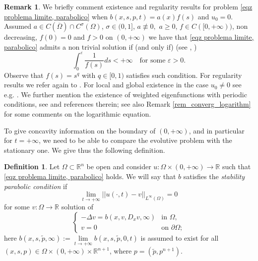 \documentclass[11pt, reqno]{amsart}
\theoremstyle{definition}
\newtheorem{remark}[lemma]{Remark}
\newtheorem{definition}[lemma]{Definition}
\numberwithin{equation}{section}
\newcommand{\Omegabar}{\overline{\Omega}}
\newcommand{\R}{\mathbb{R}}
\begin{document}
\begin{remark} \label{rem_esist_soluz}
We briefly comment existence and regularity results for problem \eqref{eqz problema limite, parabolico} when $b(x,s,p,t)=a(x) f(s)$ and $u_0=0$. 
	Assumed $a\in C(\Omegabar)\cap C^\sigma(\Omega)$, $\sigma \in (0,1]$, $a\not\equiv 0,$ $a\geq 0$, $f\in C([0,+\infty))$, non decreasing, $f(0)=0$ and $f>0$ on $(0,+\infty)$ we have that \eqref{eqz problema limite, parabolico} admits a non trivial solution if (and only if)  (see \cite[Theorem 1.5]{Fujita1968}, \cite[Corollary 2.6]{LaisterRobinsonSierzega})
	\[ \int_{0}^{\varepsilon}\frac{1}{f(s)}ds<+\infty \quad\text{for some }\varepsilon>0.\]
	Observe that $f(s)= s^q$ with $q\in [0,1)$ satisfies such condition. For regularity results we refer again to \cite{LaisterRobinsonSierzega, Fujita1968}.
	For local and global existence in the case $u_0 \neq 0$ see e.g. \cite[Lemma 3.5 and Theorem 2.1]{Kajikiya2018}. 
	We further mention the existence of weighted eigenfunctions with periodic conditions, see \cite{Daners2000, GodoyKaufmann2001} and references therein; see also Remark \ref{rem_converg_logarithm} for some comments on the logarithmic equation.
\end{remark}

To give concavity information on the boundary of $(0,+\infty)$, and in particular for $t=+\infty$, we need to be able to compare the evolutive problem with the stationary one. We give thus the following definition.
\begin{definition}\label{defn problema limite}
	Let $\Omega \subset \R^n$ be open and consider $u\colon\Omega\times (0,+\infty)\to \R$ such that \eqref{eqz problema limite, parabolico} holds.
	We will say that $b$ satisfies the \emph{stability parabolic condition} if 
\begin{equation}\label{eq_stab_par_cond}
\lim\limits_{t\to +\infty} ||u(\cdot,t)-v||_{L^\infty(\Omega)}=0 
\end{equation}
	 for some $v\colon\Omega\to \R$ solution of 
	\begin{equation}\label{eqz problema limite, ellittico}
		\begin{cases}
			-\Delta v=b(x,v,D_xv,\infty) &\text{in }\Omega,\\
			v=0 & \text{on }\partial \Omega;
		\end{cases}
	\end{equation}
	here $b(x,s,\tilde{p},\infty):=\lim\limits_{t\to+\infty}b(x,s,\tilde{p}, 0,%
t)$ is assumed to exist for all $(x,s,p)\in \Omega\times (0,+\infty)\times \R^{n+1}$, where $p=(\tilde{p},p^{n+1})$.
\end{definition}
\end{document}
